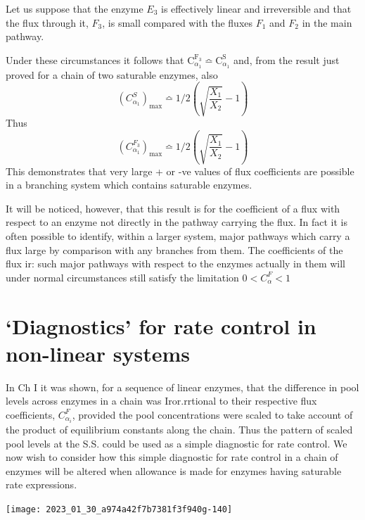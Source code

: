 Let us suppose that the enzyme $E_{3}$ is effectively linear and irreversible and that the flux through it, $F_{3}$, is small compared with the fluxes $F_{1}$ and $F_{2}$ in the main pathway.

Under these circumstances it follows that $\mathrm{C}_{\alpha_{1}}^{\mathrm{F}_{3}} \bumpeq \mathrm{C}_{\alpha_{1}}^{\mathrm{S}}$ and, from the result just proved for a chain of two saturable enzymes, also
%
$$
\left(C_{\alpha_{1}}^{S}\right)_{\max } \bumpeq 1/2\left(\sqrt{\frac{X_{1}}{X_{2}}}-1\right)
$$
%
Thus
%
$$
\left(C_{\alpha_{1}}^{F_3}\right)_{\max} \bumpeq 1/2\left(\sqrt{\frac{X_{1}}{X_{2}}}-1\right)
$$
%
This demonstrates that very large + or -ve values of flux coefficients are possible in a branching system which contains saturable enzymes.

It will be noticed, however, that this result is for the coefficient of a flux with respect to an enzyme not directly in the pathway carrying the flux. In fact it is often possible to identify, within a larger system, major pathways which carry a flux large by comparison with any branches from them. The coefficients of the flux ir: such major pathways with respect to the enzymes actually in them will under normal circumstances still satisfy the limitation $0 < C_{\alpha}^{F} < 1$

\section{`Diagnostics' for rate control in non-linear systems}

In $\mathrm{Ch}$ I it was shown, for a sequence of linear enzymes, that the difference in pool levels across enzymes in a chain was Iror.rrtional to their respective flux coefficients, $C_{\alpha_{i}}^{F}$, provided the pool concentrations were scaled to take account of the product of equilibrium constants along the chain. Thus the pattern of scaled pool levels at the S.S. could be used as a simple diagnostic for rate control. We now wish to consider how this simple diagnostic for rate control in a chain of enzymes will be altered when allowance is made for enzymes having saturable rate expressions.

\begin{center}
\texttt{[image: 2023\_01\_30\_a974a42f7b7381f3f940g-140]}
\end{center}

